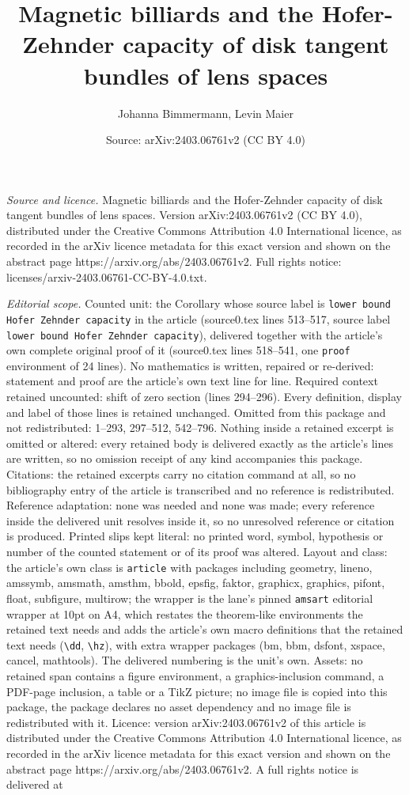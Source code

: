\documentclass[10pt,a4paper]{amsart}
\title[Magnetic billiards and the Hofer-Zehnder capacity of disk ta]{Magnetic billiards and the Hofer-Zehnder capacity of disk tangent bundles of lens spaces}
\author{Johanna Bimmermann, Levin Maier}
\date{Source: arXiv:2403.06761v2 (CC BY 4.0)}
\begin{document}
\maketitle

\noindent\emph{Source and licence.} Magnetic billiards and the Hofer-Zehnder capacity of disk tangent bundles of lens spaces. Version arXiv:2403.06761v2 (CC BY 4.0), distributed under the Creative Commons Attribution 4.0 International licence, as recorded in the arXiv licence metadata for this exact version and shown on the abstract page https://arxiv.org/abs/2403.06761v2. Full rights notice: licenses/arxiv-2403.06761-CC-BY-4.0.txt.\par\smallskip

\noindent\textit{Editorial scope.} Counted unit: the Corollary whose source label is \texttt{lower bound Hofer Zehnder capacity} in the article (source0.tex lines 513--517, source label \texttt{lower bound Hofer Zehnder capacity}), delivered together with the article's own complete original proof of it (source0.tex lines 518--541, one \texttt{proof} environment of 24 lines). No mathematics is written, repaired or re-derived: statement and proof are the article's own text line for line. Required context retained uncounted: shift of zero section (lines 294--296). Every definition, display and label of those lines is retained unchanged. Omitted from this package and not redistributed: 1--293, 297--512, 542--796. Nothing inside a retained excerpt is omitted or altered: every retained body is delivered exactly as the article's lines are written, so no omission receipt of any kind accompanies this package. Citations: the retained excerpts carry no citation command at all, so no bibliography entry of the article is transcribed and no reference is redistributed. Reference adaptation: none was needed and none was made; every reference inside the delivered unit resolves inside it, so no unresolved reference or citation is produced. Printed slips kept literal: no printed word, symbol, hypothesis or number of the counted statement or of its proof was altered. Layout and class: the article's own class is \texttt{article} with packages including geometry, lineno, amssymb, amsmath, amsthm, bbold, epsfig, faktor, graphicx, graphics, pifont, float, subfigure, multirow; the wrapper is the lane's pinned \texttt{amsart} editorial wrapper at 10pt on A4, which restates the theorem-like environments the retained text needs and adds the article's own macro definitions that the retained text needs (\texttt{\textbackslash dd}, \texttt{\textbackslash hz}), with extra wrapper packages (bm, bbm, dsfont, xspace, cancel, mathtools). The delivered numbering is the unit's own. Assets: no retained span contains a figure environment, a graphics-inclusion command, a PDF-page inclusion, a table or a TikZ picture; no image file is copied into this package, the package declares no asset dependency and no image file is redistributed with it. Licence: version arXiv:2403.06761v2 of this article is distributed under the Creative Commons Attribution 4.0 International licence, as recorded in the arXiv licence metadata for this exact version and shown on the abstract page https://arxiv.org/abs/2403.06761v2. A full rights notice is delivered at 
\end{document}
